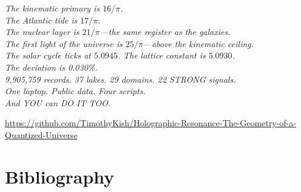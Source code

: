 \documentclass[11pt, letterpaper, openany]{book}
\begin{document}
\begin{center}
\small
\textit{The kinematic primary is $16/\pi$.\\
The Atlantic tide is $17/\pi$.\\
The nuclear layer is $21/\pi$---the same register as the galaxies.\\
The first light of the universe is $25/\pi$---above the kinematic ceiling.\\
The solar cycle ticks at $5.0945$. The lattice constant is $5.0930$.\\
The deviation is 0.030\%.\\[0.5em]
9,905,759 records. 37 lakes. 29 domains. 22 STRONG signals.\\
One laptop. Public data. Four scripts.\\[0.5em]
And YOU can DO IT TOO.}
\end{center}

\begin{center}
\url{https://github.com/TimothyKish/Holographic-Resonance-The-Geometry-of-a-Quantized-Universe}
\end{center}

\clearpage

\chapter*{Bibliography}
\end{document}
